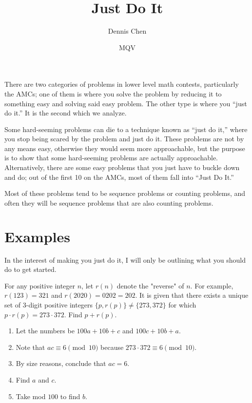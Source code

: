 \documentclass{article}
\title{Just Do It}
\author{Dennis Chen}
\date{MQV}
\begin{document}
\maketitle
There are two categories of problems in lower level math contests, particularly the AMCs; one of them is where you solve the problem by reducing it to something easy and solving said easy problem. The other type is where you ``just do it.'' It is the second which we analyze.

Some hard-seeming problems can die to a technique known as ``just do it,'' where you stop being scared by the problem and just do it. These problems are not by any means easy, otherwise they would seem more approachable, but the purpose is to show that some hard-seeming problems are actually approachable. Alternatively, there are some easy problems that you just have to buckle down and do; out of the first 10 on the AMCs, most of them fall into ``Just Do It.''

Most of these problems tend to be sequence problems or counting problems, and often they will be sequence problems that are also counting problems.

\section{Examples}
In the interest of making you just do it, I will only be outlining what you should do to get started.

\begin{exam}[CIME I 2021/3]
For any positive integer $n$, let $r(n)$ denote the "reverse" of $n$. For example, $r(123)=321$ and $r(2020)=0202=202.$ It is given that there exists a unique set of 3-digit positive integers $\{p, r(p)\} \neq \{273,372\}$ for which $p \cdot r(p) = 273 \cdot 372.$ Find $p+r(p).$
\end{exam}

\begin{walk}
\begin{enumerate}
\item Let the numbers be $100a+10b+c$ and $100c+10b+a.$

\item Note that $ac\equiv 6\pmod{10}$ because $273\cdot 372\equiv 6\pmod{10}.$

\item By size reasons, conclude that $ac=6.$

\item Find $a$ and $c.$

\item Take mod $100$ to find $b.$
\end{enumerate}
\end{walk}
\end{document}
